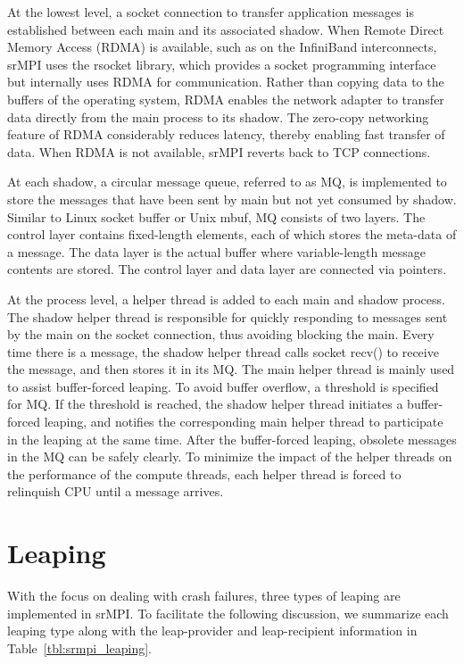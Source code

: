 At the lowest level, a socket connection to transfer application messages is established between each main and its associated shadow. When Remote Direct Memory Access (RDMA) is available, such as on the InfiniBand interconnects, srMPI uses the rsocket library, which provides a socket programming interface but internally uses RDMA for communication. Rather than copying data to the buffers of the operating system, RDMA enables the network adapter to transfer data directly from the main process to its shadow. The zero-copy networking feature of RDMA considerably reduces latency, thereby enabling fast transfer of data. When RDMA is not available, srMPI reverts back to TCP connections. 


At each shadow, a circular message queue, referred to as MQ, is implemented to store the messages that have been sent by main but not yet consumed by shadow. Similar to Linux socket buffer or Unix mbuf, MQ consists of two layers. The control layer contains fixed-length elements, each of which stores the meta-data of a message. The data layer is the actual buffer where variable-length message contents are stored. The control layer and data layer are connected via pointers. 

At the process level, a helper thread is added to each main and shadow process. The shadow helper thread is responsible for quickly responding to messages sent by the main on the socket connection, thus avoiding blocking the main. Every time there is a message, the shadow helper thread calls socket recv() to receive the message, and then stores it in its MQ. The main helper thread is mainly used to assist buffer-forced leaping. To avoid buffer overflow, a threshold is specified for MQ. If the threshold is reached, the shadow helper thread initiates a buffer-forced leaping, and notifies the corresponding main helper thread to participate in the leaping at the same time. After the buffer-forced leaping, obsolete messages in the MQ can be safely clearly. To minimize the impact of the helper threads on the performance of the compute threads, each helper thread is forced to relinquish CPU until a message arrives.





\section{Leaping}
With the focus on dealing with crash failures, three types of leaping are implemented in srMPI. To facilitate the following discussion, we summarize each leaping type along with the leap-provider and leap-recipient information in Table~\ref{tbl:srmpi_leaping}.

